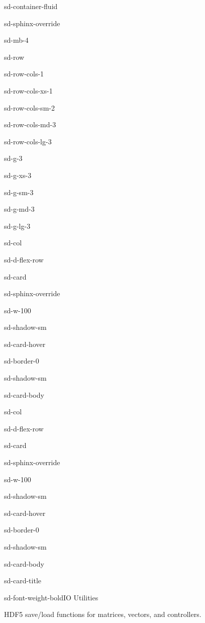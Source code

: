 \documentclass[a4paper,10pt,english]{sphinxmanual}
\begin{document}
\begin{sphinxuseclass}{sd-container-fluid}
\begin{sphinxuseclass}{sd-sphinx-override}
\begin{sphinxuseclass}{sd-mb-4}
\begin{sphinxuseclass}{sd-row}
\begin{sphinxuseclass}{sd-row-cols-1}
\begin{sphinxuseclass}{sd-row-cols-xs-1}
\begin{sphinxuseclass}{sd-row-cols-sm-2}
\begin{sphinxuseclass}{sd-row-cols-md-3}
\begin{sphinxuseclass}{sd-row-cols-lg-3}
\begin{sphinxuseclass}{sd-g-3}
\begin{sphinxuseclass}{sd-g-xs-3}
\begin{sphinxuseclass}{sd-g-sm-3}
\begin{sphinxuseclass}{sd-g-md-3}
\begin{sphinxuseclass}{sd-g-lg-3}
\begin{sphinxuseclass}{sd-col}
\begin{sphinxuseclass}{sd-d-flex-row}
\begin{sphinxuseclass}{sd-card}
\begin{sphinxuseclass}{sd-sphinx-override}
\begin{sphinxuseclass}{sd-w-100}
\begin{sphinxuseclass}{sd-shadow-sm}
\begin{sphinxuseclass}{sd-card-hover}
\begin{sphinxuseclass}{sd-border-0}
\begin{sphinxuseclass}{sd-shadow-sm}
\begin{sphinxuseclass}{sd-card-body}
\end{sphinxuseclass}{\hyperref[\detokenize{api/gpu-synthesis::doc}]{}}
\end{sphinxuseclass}
\end{sphinxuseclass}
\end{sphinxuseclass}
\end{sphinxuseclass}
\end{sphinxuseclass}
\end{sphinxuseclass}
\end{sphinxuseclass}
\end{sphinxuseclass}
\end{sphinxuseclass}
\begin{sphinxuseclass}{sd-col}
\begin{sphinxuseclass}{sd-d-flex-row}
\begin{sphinxuseclass}{sd-card}
\begin{sphinxuseclass}{sd-sphinx-override}
\begin{sphinxuseclass}{sd-w-100}
\begin{sphinxuseclass}{sd-shadow-sm}
\begin{sphinxuseclass}{sd-card-hover}
\begin{sphinxuseclass}{sd-border-0}
\begin{sphinxuseclass}{sd-shadow-sm}
\begin{sphinxuseclass}{sd-card-body}
\begin{sphinxuseclass}{sd-card-title}
\begin{sphinxuseclass}{sd-font-weight-bold}IO Utilities
\end{sphinxuseclass}
\end{sphinxuseclass}
\sphinxAtStartPar
HDF5 save/load functions for matrices, vectors, and controllers.


\end{sphinxuseclass}
\end{sphinxuseclass}
\end{sphinxuseclass}
\end{sphinxuseclass}
\end{sphinxuseclass}
\end{sphinxuseclass}
\end{sphinxuseclass}
\end{sphinxuseclass}
\end{sphinxuseclass}
\end{sphinxuseclass}
\end{sphinxuseclass}
\end{sphinxuseclass}
\end{sphinxuseclass}
\end{sphinxuseclass}
\end{sphinxuseclass}
\end{sphinxuseclass}
\end{sphinxuseclass}
\end{sphinxuseclass}
\end{sphinxuseclass}
\end{sphinxuseclass}
\end{sphinxuseclass}
\end{sphinxuseclass}
\end{sphinxuseclass}
\end{sphinxuseclass}
\end{document}
